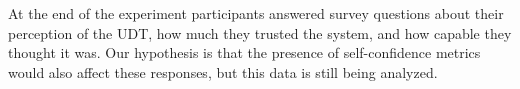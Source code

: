 At the end of the experiment participants answered survey questions about their perception of the UDT, how much they trusted the system, and how capable they thought it was. Our hypothesis is that the presence of self-confidence metrics would also affect these responses, but this data is still being analyzed.

